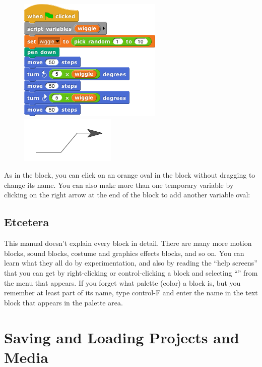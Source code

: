 \documentclass{report}
\begin{document}
\begin{figure}[H]
\begin{minipage}{0.5\textwidth}
\centering
\includegraphics[scale=\defaultGraphicsScale]{wiggling-line-script}%
\end{minipage}%
\begin{minipage}{0.5\textwidth}
\centering
\includegraphics{../common/wiggling-line}
\end{minipage}%
\end{figure}

As in the  block, you can click on an orange oval in the  block without dragging to change its name. You can also make more than one temporary variable by clicking on the right arrow at the end of the block to add another variable oval:\nopagebreak


\section{Etcetera}

This manual doesn't explain every block in detail. There are many more motion blocks, sound blocks, costume and graphics effects blocks, and so on. You can learn what they all do by experimentation, and also by reading the ``help screens'' that you can get by right-clicking or control-clicking a block and selecting ``'' from the menu that appears. If you forget what palette (color) a block is, but you remember at least part of its name, type control-F and enter the name in the text block that appears in the palette area.

\chapter{Saving and Loading Projects and Media}
\end{document}
